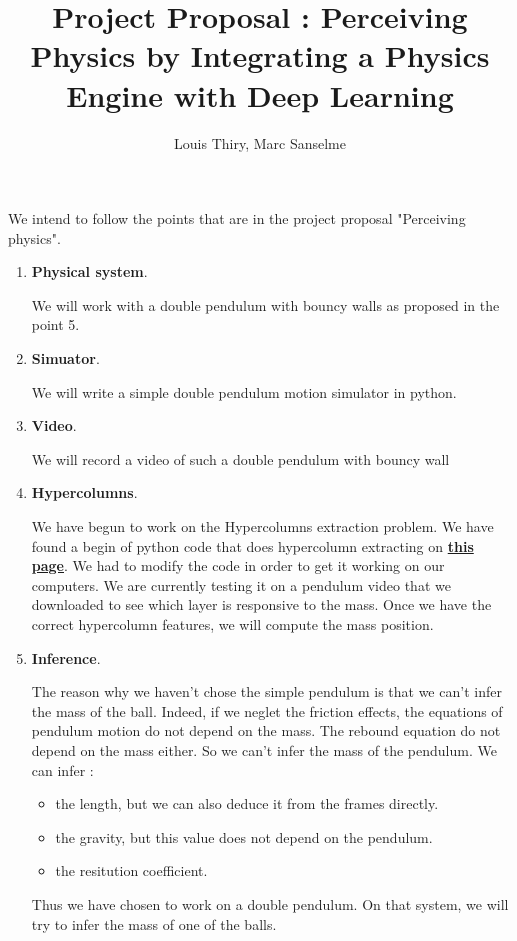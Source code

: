 \documentclass[11pt, oneside]{amsart}
\title{Project Proposal : Perceiving Physics by Integrating a Physics Engine with Deep Learning}
\author{Louis Thiry, Marc Sanselme}
\begin{document}
\maketitle

We intend to follow the points that are in the project proposal "Perceiving physics".

\begin{enumerate}
  \item \textbf{Physical system}.

    We will work with a double pendulum with bouncy walls as proposed in the point 5.
  \item \textbf{Simuator}.

    We will write a simple double pendulum motion simulator in python.
  \item \textbf{Video}.

    We will record a video of such a double pendulum with bouncy wall
  \item \textbf{Hypercolumns}.

    We have begun to work on the Hypercolumns extraction problem.
    We have found a begin of python code that does hypercolumn extracting on \href{http://blog.christianperone.com/2016/01/convolutional-hypercolumns-in-python/}{\textbf{this page}}.
    We had to modify the code in order to get it working on our computers.
    We are currently testing it on a pendulum video that we downloaded to see which layer is responsive to the mass.
    Once we have the correct hypercolumn features, we will compute the mass position.
  \item \textbf{Inference}.

    The reason why we haven't chose the simple pendulum is that we can't infer the mass of the ball.
    Indeed, if we neglet the friction effects, the equations of pendulum motion do not depend on the mass.
    The rebound equation do not depend on the mass either.
    So we can't infer the mass of the pendulum.
    We can infer :
    \begin{itemize}
      \item the length, but we can also deduce it from the frames directly.
      \item the gravity, but this value does not depend on the pendulum.
      \item the resitution coefficient.
    \end{itemize}
    Thus we have chosen to work on a double pendulum.
    On that system, we will try to infer the mass of one of the balls.
\end{enumerate}
\end{document}
